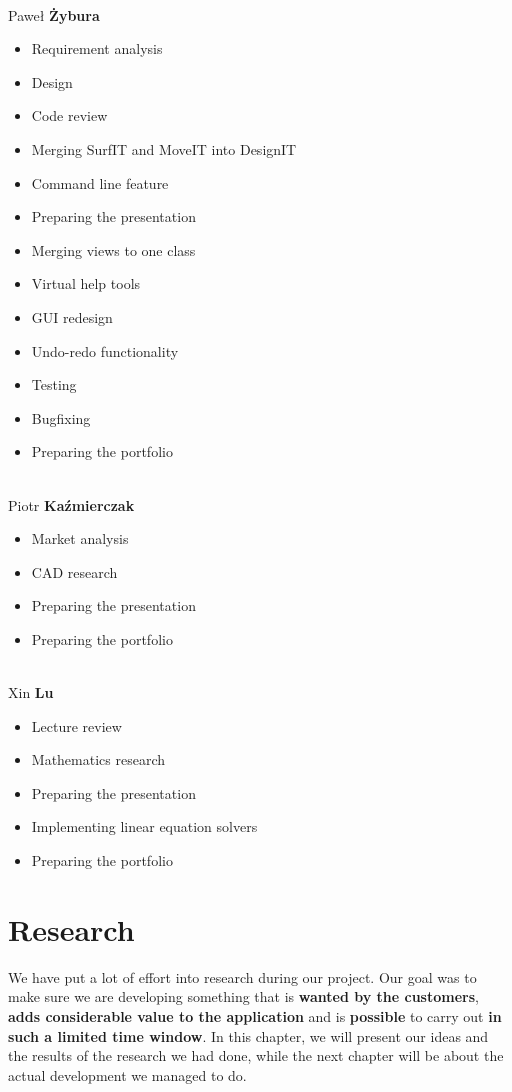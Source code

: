 \documentclass[a4paper, 11pt, article]{report}
\begin{document}
\noindent \\ Paweł \textbf{Żybura} 
\begin{itemize}
	\item Requirement analysis
	\item Design
	\item Code review
	\item Merging SurfIT and MoveIT into DesignIT
	\item Command line feature
	\item Preparing the presentation
	\item Merging views to one class
	\item Virtual help tools
	\item GUI redesign
	\item Undo-redo functionality
	\item Testing 
	\item Bugfixing
	\item Preparing the portfolio
\end{itemize}

\noindent \\ Piotr \textbf{Kaźmierczak} 
\begin{itemize}
	\item Market analysis
	\item CAD research
	\item Preparing the presentation
	\item Preparing the portfolio
\end{itemize}

\noindent \\ Xin \textbf{Lu}
\begin{itemize}
	\item Lecture review
	\item Mathematics research
	\item Preparing the presentation
	\item Implementing linear equation solvers
	\item Preparing the portfolio
\end{itemize}


\chapter{Research}

We have put a lot of effort into research during our project. Our goal was to make sure we are developing something that is \textbf{wanted by the customers}, \textbf{adds considerable value to the application} and is \textbf{possible} to carry out \textbf{in such a limited time window}. In this chapter, we will present our ideas and the results of the research we had done, while the next chapter will be about the actual development we managed to do.
\end{document}
